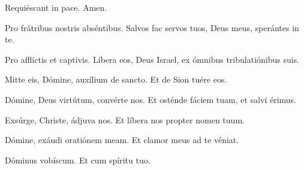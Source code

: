 \vv Requiéscant in pace.
\rr Amen.

\vv Pro frátribus nostris abséntibus.
\rr Salvos fac servos tuos, Deus meus, sperántes in te.

\vv Pro afflíctis et captívis.
\rr Líbera eos, Deus Israel, ex ómnibus tribulatiónibus suis.

\vv Mitte eis, Dómine, auxílium de sancto.
\rr Et de Sion tuére eos.

\vv Dómine, Deus virtútum, convérte nos.
\rr Et osténde fáciem tuam, et salvi érimus.

\vv Exsúrge, Christe, ádjuva nos.
\rr Et líbera nos propter nomen tuum.

\vv Dómine, exáudi oratiónem meam.
\rr Et clamor meus ad te véniat.

\vv Dóminus vobíscum. \rr Et cum spíritu tuo.

